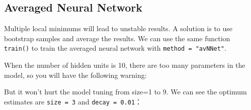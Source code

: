 \documentclass[]{book}
\newenvironment{Shaded}{\begin{snugshade}}{\end{snugshade}}
\newcommand{\KeywordTok}[1]{\textcolor[rgb]{0.13,0.29,0.53}{\textbf{{#1}}}}
\newcommand{\DataTypeTok}[1]{\textcolor[rgb]{0.13,0.29,0.53}{{#1}}}
\newcommand{\DecValTok}[1]{\textcolor[rgb]{0.00,0.00,0.81}{{#1}}}
\newcommand{\FloatTok}[1]{\textcolor[rgb]{0.00,0.00,0.81}{{#1}}}
\newcommand{\StringTok}[1]{\textcolor[rgb]{0.31,0.60,0.02}{{#1}}}
\newcommand{\CommentTok}[1]{\textcolor[rgb]{0.56,0.35,0.01}{\textit{{#1}}}}
\newcommand{\OtherTok}[1]{\textcolor[rgb]{0.56,0.35,0.01}{{#1}}}
\newcommand{\NormalTok}[1]{{#1}}
\theoremstyle{definition}
\theoremstyle{definition}
\theoremstyle{remark}
\begin{document}
\subsection{Averaged Neural Network}\label{averaged-neural-network}

Multiple local minimums will lead to unstable results. A solution is to
use bootstrap samples and average the results. We can use the same
function \texttt{train()} to train the averaged neural network with
\texttt{method\ =\ "avNNet"}.

\begin{Shaded}
\end{Shaded}

When the number of hidden units is 10, there are too many parameters in
the model, so you will have the following warning:

But it won't hurt the model tuning from size=1 to 9. We can see the
optimum estimates are \texttt{size\ =\ 3} and \texttt{decay\ =\ 0.01}：
\end{document}

